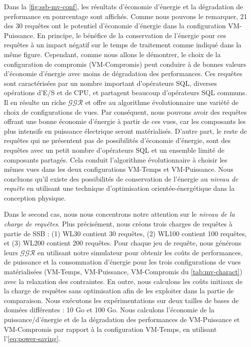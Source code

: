Dans la \ref{fig:ssb-mv-conf}, les résultats d'économie d'énergie et la dégradation de performance en pourcentage sont affichés. Comme nous pouvons le remarquer, 21 des 30 requêtes ont le potentiel d'économie d'énergie dans la configuration VM-Puissance. En principe, le bénéfice de la conservation de l'énergie pour ces requêtes à un impact négatif sur le temps de traitement comme indiqué dans la même figure. Cependant, comme nous allons le démontrer, le choix de la configuration de compromis (VM-Compromis) peut conduire à de bonnes valeurs d'économie d'énergie avec moins de dégradation des performances. Ces requêtes sont caractérisées par un nombre important d'opérateurs SQL, diverses opérations d'E/S et de CPU, et partagent beaucoup d'opérateurs SQL communs. Il en résulte un riche $\mathcal{GGR} $ et offre au algorithme évolutionnaire une variété de choix de configurations de vues. Par conséquent, nous pouvons avoir des requêtes offrant une bonne économie d'énergie à partir de ces vues, car les composants les plus intensifs en puissance électrique seront matérialisés. D'autre part, le reste de requêtes qui ne présentent pas de possibilités d'économie d'énergie, sont des requêtes avec un petit nombre d'opérateurs SQL et un ensemble limité de composants partagés. Cela conduit l'algorithme évolutionnaire à choisir les mêmes vues dans les deux configurations VM-Temps et VM-Puissance. Nous concluons qu'il existe des possibilités de conservation de l'énergie au \textit{niveau de requête} en utilisant une technique d'optimisation orientée-énergétique dans la conception physique.

Dans le second cas, nous nous concentrons notre attention sur le \textit{niveau de la charge de requêtes}. Plus précisément, nous créons trois charges de requêtes à partie de SSB : (1) WL30 contient 30 requêtes, (2) WL100 contient 100 requêtes, et (3) WL200 contient 200 requêtes. Pour chaque jeu de requête, nous générons leurs $\mathcal{GGR}$ en utilisant notre simulateur pour obtenir les coûts de performances, de puissance et la consommation d'énergie pour les trois configurations de vues matérialisées (VM-Temps, VM-Puissance, VM-Compromis du \ref{tab:mv-charact}) avec la relaxation des contraintes. En outre, nous calculons les coûts initiaux de la charge de requêtes sans optimisation afin de les exploiter dans la partie de comparaison. Nous exécutons les expérimentations sur deux tailles de bases de données différentes : 10 Go et 100 Go. Nous calculons l'économie de la puissance/d'énergie et de la dégradation des performances de VM-Puissance et VM-Compromis par rapport à la configuration VM-Temps, en utilisant l'\ref{eq:power-saving}.

